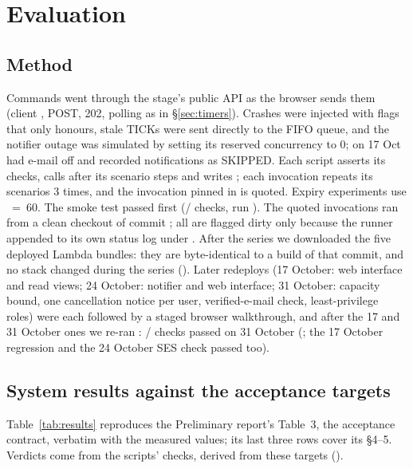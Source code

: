 \section{Evaluation}\label{sec:evaluation}

\subsection{Method}
Commands went through the  stage's public API as the browser sends them (client
, POST, 202, polling as in \S\ref{sec:timers}). Crashes were injected with
 flags that only  honours, stale TICKs were sent directly to the FIFO queue,
and the notifier outage was simulated by setting its reserved concurrency to 0; on 17 Oct  had
e-mail off and recorded notifications as SKIPPED. Each script asserts its checks, calls 
after its scenario steps and writes ; each invocation repeats its
scenarios 3 times, and the invocation pinned in  is quoted. Expiry
experiments use ~=~60. The smoke test passed first
(\SmokeChecksPassed/\SmokeChecksTotal{} checks, run \code{\SmokeRunId}). The \SeriesExperiments{}
quoted invocations ran from a clean checkout of commit \code{\SeriesCommits}; all \SeriesDirtyRuns{}
are flagged dirty only because the runner appended to its own status log under .
After the series we downloaded the five deployed Lambda bundles: they are byte-identical to a build
of that commit, and no stack changed during the series
(). Later redeploys (17 October: web
interface and read views; 24 October: notifier and web interface; 31 October:
capacity bound, one cancellation notice per user, verified-e-mail check, least-privilege roles) were
each followed by a staged browser walkthrough, and after the 17 and 31 October ones we re-ran
\RegressionExperiments: \RegressionChecksPassed/\RegressionChecksTotal{} checks passed on 31 October
(; the 17 October regression and the 24 October SES check passed too).

\subsection{System results against the acceptance targets}\label{sec:results}
Table~\ref{tab:results} reproduces the Preliminary report's Table~3, the acceptance contract,
verbatim with the measured values; its last three rows cover its \S4--5. Verdicts come from the
scripts' checks, derived from these targets ().

